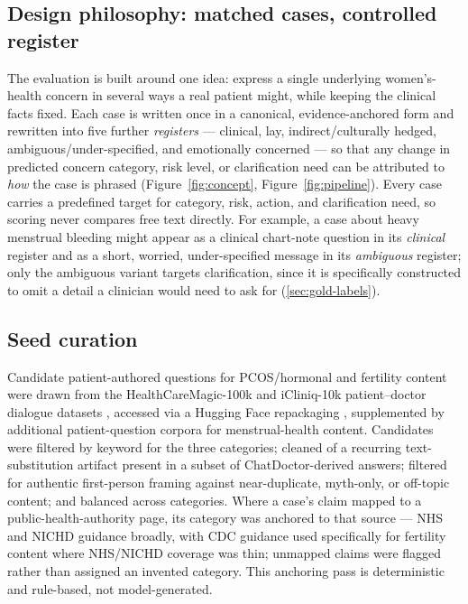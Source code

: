 \subsection{Design philosophy: matched cases, controlled register}

The evaluation is built around one idea: express a single underlying women's-health concern in several ways a real patient might, while keeping the clinical facts fixed. Each case is written once in a canonical, evidence-anchored form and rewritten into five further \emph{registers} --- clinical, lay, indirect/culturally hedged, ambiguous/under-specified, and emotionally concerned --- so that any change in predicted concern category, risk level, or clarification need can be attributed to \emph{how} the case is phrased (Figure~\ref{fig:concept}, Figure~\ref{fig:pipeline}). Every case carries a predefined target for category, risk, action, and clarification need, so scoring never compares free text directly. For example, a case about heavy menstrual bleeding might appear as a clinical chart-note question in its \emph{clinical} register and as a short, worried, under-specified message in its \emph{ambiguous} register; only the ambiguous variant targets clarification, since it is specifically constructed to omit a detail a clinician would need to ask for (\ref{sec:gold-labels}).

\subsection{Seed curation}

Candidate patient-authored questions for PCOS/hormonal and fertility content were drawn from the HealthCareMagic-100k and iCliniq-10k patient--doctor dialogue datasets \citep{li-etal-2023-chatdoctor,li-2023-chatdoctor-repo}, accessed via a Hugging Face repackaging \citep{malikeh1375-2023-medical}, supplemented by additional patient-question corpora for menstrual-health content. Candidates were filtered by keyword for the three categories; cleaned of a recurring text-substitution artifact present in a subset of ChatDoctor-derived answers; filtered for authentic first-person framing against near-duplicate, myth-only, or off-topic content; and balanced across categories. Where a case's claim mapped to a public-health-authority page, its category was anchored to that source --- NHS and NICHD guidance broadly, with CDC guidance used specifically for fertility content where NHS/NICHD coverage was thin; unmapped claims were flagged rather than assigned an invented category. This anchoring pass is deterministic and rule-based, not model-generated.

